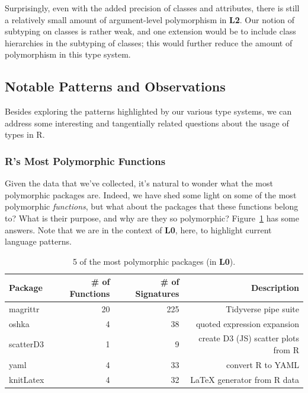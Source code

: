 \documentclass[acmsmall,10pt,review,anonymous]{acmart}\settopmatter{printfolios=true,printccs=false,printacmref=false}
\begin{document}
Surprisingly, even with the added precision of classes and attributes, there is still a relatively small amount of argument-level polymorphism in {\bf L2}.
Our notion of subtyping on classes is rather weak, and one extension would be to include class hierarchies in the subtyping of classes;
this would further reduce the amount of polymorphism in this type system.

%
%
%
%
\subsection{Notable Patterns and Observations}

Besides exploring the patterns highlighted by our various type systems, we can address some interesting and tangentially related questions about the usage of types in R.

%
%
%
%
\subsubsection{R's Most Polymorphic Functions}

Given the data that we've collected, it's natural to wonder what the most polymorphic packages are.
Indeed, we have shed some light on some of the most polymorphic {\it functions}, but what about the packages that these functions belong to?
What is their purpose, and why are they so polymorphic?
Figure~\ref{tab:packagepolysize} has some answers.
Note that we are in the context of {\bf L0}, here, to highlight current language patterns.

\begin{table}[ht]
\label{tab:packagepolysize}
\centering
\begin{tabular}{lrrr}
  \hline
  Package & \# of Functions &\# of Signatures & Description \\ 
  \hline
  magrittr & 20 & 225 & Tidyverse pipe suite \\ 
  oshka & 4 & 38 & quoted expression expansion \\ 
  scatterD3 & 1 & 9 & create D3 (JS) scatter plots from R \\ 
  yaml & 4 & 33 & convert R to YAML \\ 
  knitLatex & 4 & 32 & \LaTeX \xspace generator from R data \\ 
   \hline
\end{tabular}
\caption{5 of the most polymorphic packages (in {\bf L0}).}
\end{table}
\end{document}
